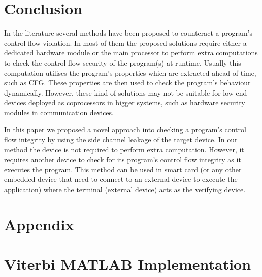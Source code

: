 \documentclass[lnicst]{svmultln}
\begin{document}
\section{Conclusion}
\label{sec:conclusion}

In the literature several methods have been proposed to counteract a program's control flow violation. In most of them the proposed solutions require either a dedicated hardware module or the main processor to perform extra computations to check the control flow security of the program(s) at runtime. Usually this computation utilises the program's properties which are extracted ahead of time, such as CFG. These properties are then used to check the program's behaviour dynamically. However, these kind of solutions may not be suitable for low-end devices deployed as coprocessors in bigger systems, such as hardware security modules in communication devices.

In this paper we proposed a novel approach into checking a program's control flow integrity by using the side channel leakage of the target device. In our method the device is not required to perform extra computation. However, it requires another device to check for its program's control flow integrity as it executes the program. This method can be used in smart card (or any other embedded device that need to connect to an external device to execute the application) where the terminal (external device) acts as the verifying device.




\appendix

\section*{Appendix}

\section{Viterbi MATLAB Implementation}
\label{sec:viterbi-implementation}




\end{document}
